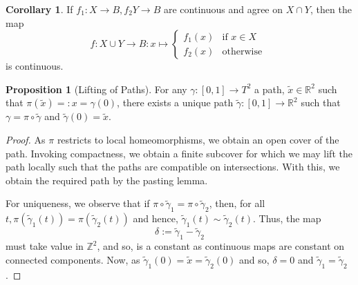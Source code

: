 \documentclass[]{article}
\theoremstyle{definition}
\newtheorem{corollary}{Corollary}[theorem]
\theoremstyle{definition}
\newtheorem{proposition}{Proposition}[section]
\begin{document}
\begin{corollary}
  If \(f_1 : X \to B, f_2 Y \to B\) are continuous and agree on \(X \cap Y\), then 
  the map 
  \[f : X \cup Y \to B : x \mapsto \begin{cases}
    f_1(x) & \text{if } x \in X \\
    f_2(x) & \text{otherwise }
  \end{cases}\]
  is continuous.
\end{corollary}

\begin{proposition}[Lifting of Paths]
  For any \(\gamma : [0, 1] \to T^2\) a path, \(\tilde x \in \mathbb{R}^2\) such that 
  \(\pi(\tilde x) =: x = \gamma(0)\), there exists a unique path 
  \(\tilde \gamma : [0, 1] \to \mathbb{R}^2\) such that \(\gamma = \pi \circ \tilde \gamma\) 
  and \(\tilde \gamma(0) = \tilde x\).
\end{proposition}
\begin{proof}
  As \(\pi\) restricts to local homeomorphisms, we obtain an open cover of the path. 
  Invoking compactness, we obtain a finite subcover for which we may lift the path 
  locally such that the paths are compatible on intersections. With this, we 
  obtain the required path by the pasting lemma.

  For uniqueness, we observe that if \(\pi \circ \tilde \gamma_1 = \pi \circ \tilde \gamma_2\),
  then, for all \(t, \pi(\tilde \gamma_1(t)) = \pi(\tilde \gamma_2(t))\) and hence, 
  \(\tilde \gamma_1(t) \sim \tilde \gamma_2(t)\). Thus, the map 
  \[\delta := \tilde \gamma_1 - \tilde \gamma_2\]
  must take value in \(\mathbb{Z}^2\), and so, is a constant as continuous maps are 
  constant on connected components. Now, as \(\tilde \gamma_1(0) = \tilde x = \tilde \gamma_2(0)\) 
  and so, \(\delta = 0\) and \(\tilde \gamma_1 = \tilde \gamma_2\).
\end{proof}
\end{document}
